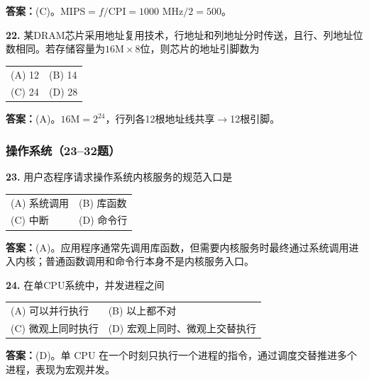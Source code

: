 \ifshowsolutions\par\noindent\textbf{答案：}(C)。MIPS$=f/\text{CPI}=1000\text{ MHz}/2=500$。\else \answerarea \fi

\vspace{6pt}

\noindent\textbf{22.} 某DRAM芯片采用地址复用技术，行地址和列地址分时传送，且行、列地址位数相同。若存储容量为$16\text{M}\times 8$位，则芯片的地址引脚数为
\begin{center}
\begin{tabular}{ll}
(A) 12 & (B) 14 \\[6pt]
(C) 24 & (D) 28
\end{tabular}
\end{center}

\ifshowsolutions\par\noindent\textbf{答案：}(A)。$16\text{M}=2^{24}$，行列各12根地址线共享$\to$12根引脚。\else \answerarea \fi

\subsubsection*{操作系统（23--32题）}

\noindent\textbf{23.} 用户态程序请求操作系统内核服务的规范入口是
\begin{center}
\begin{tabular}{ll}
(A) 系统调用 & (B) 库函数 \\[6pt]
(C) 中断 & (D) 命令行
\end{tabular}
\end{center}

\ifshowsolutions\par\noindent\textbf{答案：}(A)。应用程序通常先调用库函数，但需要内核服务时最终通过系统调用进入内核；普通函数调用和命令行本身不是内核服务入口。\else \answerarea \fi

\vspace{6pt}

\noindent\textbf{24.} 在单CPU系统中，并发进程之间
\begin{center}
\begin{tabular}{ll}
(A) 可以并行执行 & (B) 以上都不对 \\[6pt]
(C) 微观上同时执行 & (D) 宏观上同时、微观上交替执行
\end{tabular}
\end{center}

\ifshowsolutions\par\noindent\textbf{答案：}(D)。单 CPU 在一个时刻只执行一个进程的指令，通过调度交替推进多个进程，表现为宏观并发。\else \answerarea \fi

